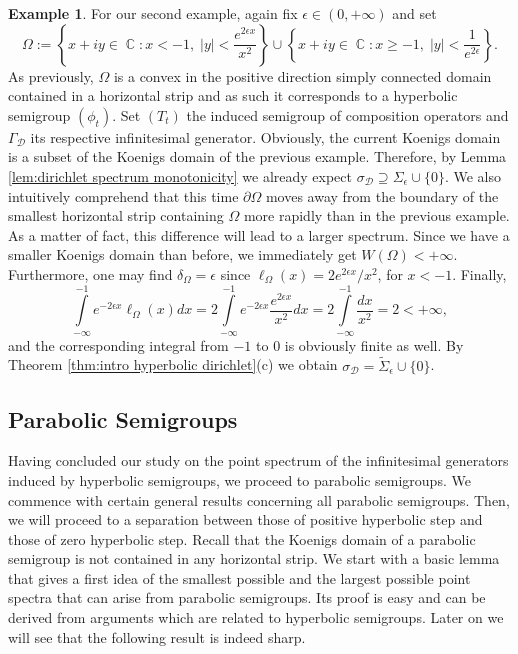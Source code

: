 \documentclass[11pt]{amsart}
\numberwithin{equation}{section}
\theoremstyle{definition}
\newtheorem{example}[theorem]{Example}
\DeclareMathOperator{\C}{\mathbb{C}}
\begin{document}
	\begin{example}
		For our second example, again fix $\epsilon\in(0,+\infty)$ and set
		$$\Omega:=\left\{x+iy\in\C:x<-1, \; |y|<\dfrac{e^{2\epsilon x}}{x^2}\right\}\cup\left\{x+iy\in\C:x\ge-1, \; |y|<\dfrac{1}{e^{2\epsilon}}\right\}.$$
		As previously, $\Omega$ is a convex in the positive direction simply connected domain contained in a horizontal strip and as such it corresponds to a hyperbolic semigroup $(\phi_t)$. Set $(T_t)$ the induced semigroup of composition operators and $\Gamma_\mathcal{D}$ its respective infinitesimal generator. Obviously, the current Koenigs domain is a subset of the Koenigs domain of the previous example. Therefore, by Lemma \ref{lem:dirichlet spectrum monotonicity} we already expect $\sigma_{\mathcal{D}}\supseteq\Sigma_\epsilon\cup\{0\}$. We also intuitively comprehend that this time $\partial\Omega$ moves away from the boundary of the smallest horizontal strip containing $\Omega$ more rapidly than in the previous example. As a matter of fact, this difference will lead to a larger spectrum. Since we have a smaller Koenigs domain than before, we immediately get $W(\Omega)<+\infty$. Furthermore, one may find $\delta_\Omega=\epsilon$ since $\ell_\Omega(x)=2e^{2\epsilon x}/x^2$, for $x<-1$. Finally, 
		$$\int\limits_{-\infty}^{-1}e^{-2\epsilon x}\ell_\Omega(x)dx=2\int\limits_{-\infty}^{-1}e^{-2\epsilon x}\dfrac{e^{2\epsilon x}}{x^2}dx=2\int\limits_{-\infty}^{-1}\dfrac{dx}{x^2}=2<+\infty,$$
		and the corresponding integral from $-1$ to $0$ is obviously finite as well. By Theorem \ref{thm:intro hyperbolic dirichlet}(c) we obtain $\sigma_{\mathcal{D}}=\widetilde{\Sigma}_\epsilon\cup\{0\}$.
	\end{example}
	
	
	
	
	\subsection{Parabolic Semigroups}
	Having concluded our study on the point spectrum of the infinitesimal generators induced by hyperbolic semigroups, we proceed to parabolic semigroups. We commence with certain general results concerning all parabolic semigroups. Then, we will proceed to a separation between those of positive hyperbolic step and those of zero hyperbolic step. Recall that the Koenigs domain of a parabolic semigroup is not contained in any horizontal strip. 
	We start with a basic lemma that gives a first idea of the smallest possible and the largest possible point spectra that can arise from parabolic semigroups. Its proof is easy and can be derived from arguments which are related to hyperbolic semigroups. Later on we will see that the following result is indeed sharp.
	
\end{document}

